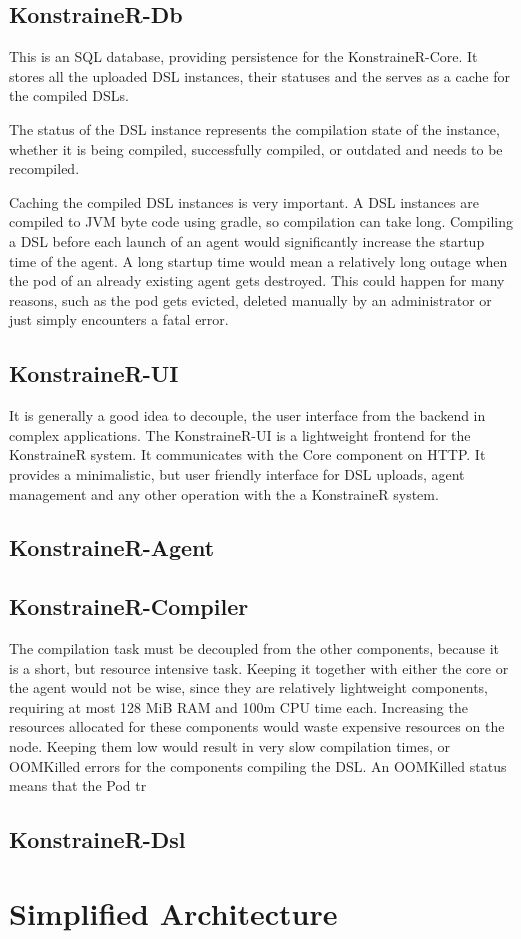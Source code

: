 \subsection{KonstraineR-Db}

This is an SQL database, providing persistence for the KonstraineR-Core. It stores all the uploaded DSL instances, their statuses and the serves as a cache for the compiled DSLs.

The status of the DSL instance represents the compilation state of the instance, whether it is being compiled, successfully compiled, or outdated and needs to be recompiled.

Caching the compiled DSL instances is very important. A DSL instances are compiled to JVM byte code using gradle, so compilation can take long. Compiling a DSL before each launch of an agent would significantly increase the startup time of the agent. A long startup time would mean a relatively long outage when the pod of an already existing agent gets destroyed. This could happen for many reasons, such as the pod gets evicted, deleted manually by an administrator or just simply encounters a fatal error.

\subsection{KonstraineR-UI}

It is generally a good idea to decouple, the user interface from the backend in complex applications. The KonstraineR-UI  is a lightweight frontend for the KonstraineR system. It communicates with the Core component on HTTP. It provides a minimalistic, but user friendly interface for DSL uploads, agent management and any other operation with the a KonstraineR system.

\subsection{KonstraineR-Agent}



\subsection{KonstraineR-Compiler}

The compilation task must be decoupled from the other components, because it is a short, but resource intensive task. Keeping it together with either the core or the agent would not be wise, since they are relatively lightweight components, requiring at most 128 MiB RAM and 100m CPU time each. Increasing the resources allocated for these components would waste expensive resources on the node. Keeping them low would result in very slow compilation times, or OOMKilled errors for the components compiling the DSL. An OOMKilled status means that the Pod tr

\subsection{KonstraineR-Dsl}

\section{Simplified Architecture}

